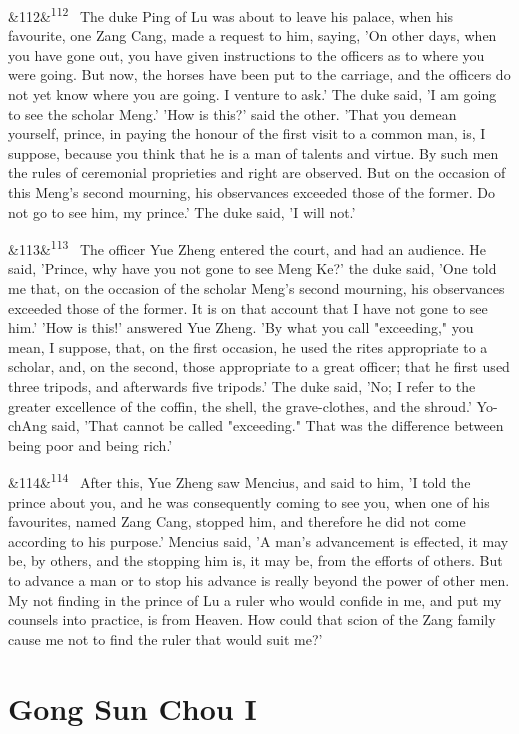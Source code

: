 \documentclass[12pt]{article}
\newcommand{\para}[1][]{\par\noindent\ifx&#1&\else\textsuperscript{\footnotesize #1}~\fi}
\begin{document}
\para[112] The duke Ping of Lu was about to leave his palace, when his favourite, one Zang Cang, made a request to him, saying, 'On other days, when you have gone out, you have given instructions to the officers as to where you were going. But now, the horses have been put to the carriage, and the officers do not yet know where you are going. I venture to ask.' The duke said, 'I am going to see the scholar Meng.' 'How is this?' said the other. 'That you demean yourself, prince, in paying the honour of the first visit to a common man, is, I suppose, because you think that he is a man of talents and virtue. By such men the rules of ceremonial proprieties and right are observed. But on the occasion of this Meng's second mourning, his observances exceeded those of the former. Do not go to see him, my prince.' The duke said, 'I will not.'

\para[113] The officer Yue Zheng entered the court, and had an audience. He said, 'Prince, why have you not gone to see Meng Ke?' the duke said, 'One told me that, on the occasion of the scholar Meng's second mourning, his observances exceeded those of the former. It is on that account that I have not gone to see him.' 'How is this!' answered Yue Zheng. 'By what you call "exceeding," you mean, I suppose, that, on the first occasion, he used the rites appropriate to a scholar, and, on the second, those appropriate to a great officer; that he first used three tripods, and afterwards five tripods.' The duke said, 'No; I refer to the greater excellence of the coffin, the shell, the grave-clothes, and the shroud.' Yo-chAng said, 'That cannot be called "exceeding." That was the difference between being poor and being rich.'

\para[114] After this, Yue Zheng saw Mencius, and said to him, 'I told the prince about you, and he was consequently coming to see you, when one of his favourites, named Zang Cang, stopped him, and therefore he did not come according to his purpose.' Mencius said, 'A man's advancement is effected, it may be, by others, and the stopping him is, it may be, from the efforts of others. But to advance a man or to stop his advance is really beyond the power of other men. My not finding in the prince of Lu a ruler who would confide in me, and put my counsels into practice, is from Heaven. How could that scion of the Zang family cause me not to find the ruler that would suit me?'

\section*{Gong Sun Chou I}
\end{document}
